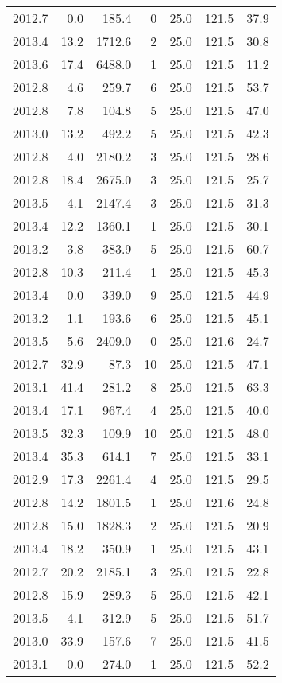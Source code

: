 \begin{tabular}{rrrrrrr}
2012.7 & 0.0 & 185.4 & 0 & 25.0 & 121.5 & 37.9 \\
2013.4 & 13.2 & 1712.6 & 2 & 25.0 & 121.5 & 30.8 \\
2013.6 & 17.4 & 6488.0 & 1 & 25.0 & 121.5 & 11.2 \\
2012.8 & 4.6 & 259.7 & 6 & 25.0 & 121.5 & 53.7 \\
2012.8 & 7.8 & 104.8 & 5 & 25.0 & 121.5 & 47.0 \\
2013.0 & 13.2 & 492.2 & 5 & 25.0 & 121.5 & 42.3 \\
2012.8 & 4.0 & 2180.2 & 3 & 25.0 & 121.5 & 28.6 \\
2012.8 & 18.4 & 2675.0 & 3 & 25.0 & 121.5 & 25.7 \\
2013.5 & 4.1 & 2147.4 & 3 & 25.0 & 121.5 & 31.3 \\
2013.4 & 12.2 & 1360.1 & 1 & 25.0 & 121.5 & 30.1 \\
2013.2 & 3.8 & 383.9 & 5 & 25.0 & 121.5 & 60.7 \\
2012.8 & 10.3 & 211.4 & 1 & 25.0 & 121.5 & 45.3 \\
2013.4 & 0.0 & 339.0 & 9 & 25.0 & 121.5 & 44.9 \\
2013.2 & 1.1 & 193.6 & 6 & 25.0 & 121.5 & 45.1 \\
2013.5 & 5.6 & 2409.0 & 0 & 25.0 & 121.6 & 24.7 \\
2012.7 & 32.9 & 87.3 & 10 & 25.0 & 121.5 & 47.1 \\
2013.1 & 41.4 & 281.2 & 8 & 25.0 & 121.5 & 63.3 \\
2013.4 & 17.1 & 967.4 & 4 & 25.0 & 121.5 & 40.0 \\
2013.5 & 32.3 & 109.9 & 10 & 25.0 & 121.5 & 48.0 \\
2013.4 & 35.3 & 614.1 & 7 & 25.0 & 121.5 & 33.1 \\
2012.9 & 17.3 & 2261.4 & 4 & 25.0 & 121.5 & 29.5 \\
2012.8 & 14.2 & 1801.5 & 1 & 25.0 & 121.6 & 24.8 \\
2012.8 & 15.0 & 1828.3 & 2 & 25.0 & 121.5 & 20.9 \\
2013.4 & 18.2 & 350.9 & 1 & 25.0 & 121.5 & 43.1 \\
2012.7 & 20.2 & 2185.1 & 3 & 25.0 & 121.5 & 22.8 \\
2012.8 & 15.9 & 289.3 & 5 & 25.0 & 121.5 & 42.1 \\
2013.5 & 4.1 & 312.9 & 5 & 25.0 & 121.5 & 51.7 \\
2013.0 & 33.9 & 157.6 & 7 & 25.0 & 121.5 & 41.5 \\
2013.1 & 0.0 & 274.0 & 1 & 25.0 & 121.5 & 52.2 \\

\end{tabular}
